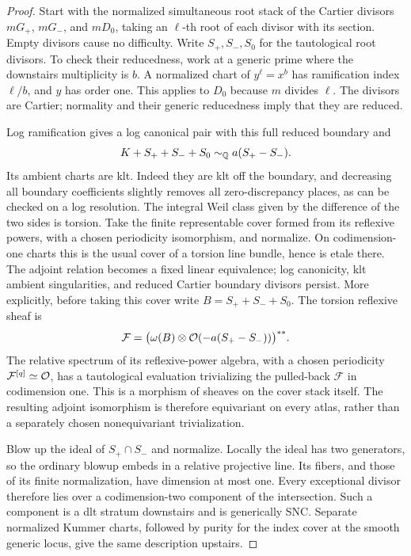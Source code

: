 \begin{proof}
Start with the normalized simultaneous root stack of the Cartier
divisors $mG_+$, $mG_-$, and $mD_0$, taking an $\ell$-th root of
each divisor with its section.  Empty divisors cause no difficulty.
Write $S_+,S_-,S_0$ for the tautological root divisors.
To check their reducedness, work at a generic prime where the
downstairs multiplicity is $b$.  A normalized chart of
$y^\ell=x^b$ has ramification index $\ell/b$, and $y$ has order
one.  This applies to $D_0$ because $m$ divides $\ell$.
The divisors are Cartier; normality and their generic
reducedness imply that they are reduced.

Log ramification gives a log canonical pair with this full
reduced boundary and
\[
 K+S_++S_-+S_0\sim_{\mathbb{Q}}a(S_+-S_-).
\]
Its ambient charts are klt.  Indeed they are klt off the boundary,
and decreasing all boundary coefficients slightly removes all
zero-discrepancy places, as can be checked on a log resolution.
The integral Weil class given by the difference of the two
sides is torsion.  Take the finite representable cover formed
from its reflexive powers, with a chosen periodicity
isomorphism, and normalize.  On codimension-one charts this is
the usual cover of a torsion line bundle, hence is etale there.
The adjoint relation becomes a fixed linear equivalence;
log canonicity, klt ambient singularities, and reduced Cartier
boundary divisors persist.
More explicitly, before taking this cover write
$B=S_++S_-+S_0$.  The torsion reflexive sheaf is
\[
 \mathcal F=
 \bigl(\omega(B)\otimes\mathcal{O}(-a(S_+-S_-))\bigr)^{**}.
\]
The relative spectrum of its reflexive-power algebra, with a
chosen periodicity $\mathcal F^{[q]}\simeq\mathcal{O}$, has a
tautological evaluation trivializing the pulled-back
$\mathcal F$ in codimension one.  This is a morphism of
sheaves on the cover stack itself.  The resulting adjoint
isomorphism is therefore equivariant on every atlas, rather
than a separately chosen nonequivariant trivialization.

Blow up the ideal of $S_+\cap S_-$ and normalize.  Locally the
ideal has two generators, so the ordinary blowup embeds in a
relative projective line.  Its fibers, and those of its finite
normalization, have dimension at most one.  Every exceptional
divisor therefore lies over a codimension-two component of the
intersection.  Such a component is a dlt stratum downstairs and
is generically SNC.  Separate normalized Kummer charts, followed
by purity for the index cover at the smooth generic locus,
give the same description upstairs.


\end{proof}
